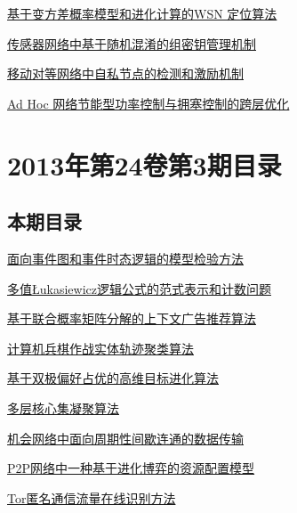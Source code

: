 \documentclass[a4paper]{article}
\begin{document}
\href{http://www.jos.org.cn/ch/reader/download_pdf.aspx?file_no=4255&year_id=2013&quarter_id=4&falg=1}{基于变方差概率模型和进化计算的WSN 定位算法}

\href{http://www.jos.org.cn/ch/reader/download_pdf.aspx?file_no=4270&year_id=2013&quarter_id=4&falg=1}{传感器网络中基于随机混淆的组密钥管理机制}

\href{http://www.jos.org.cn/ch/reader/download_pdf.aspx?file_no=4290&year_id=2013&quarter_id=4&falg=1}{移动对等网络中自私节点的检测和激励机制}

\href{http://www.jos.org.cn/ch/reader/download_pdf.aspx?file_no=4317&year_id=2013&quarter_id=4&falg=1}{Ad Hoc 网络节能型功率控制与拥塞控制的跨层优化}


\section{\textbf{2013年第24卷第3期目录}}
\subsection{本期目录}
\href{http://www.jos.org.cn/ch/reader/download_pdf.aspx?file_no=4162&year_id=2013&quarter_id=3&falg=1}{面向事件图和事件时态逻辑的模型检验方法}

\href{http://www.jos.org.cn/ch/reader/download_pdf.aspx?file_no=4231&year_id=2013&quarter_id=3&falg=1}{多值Łukasiewicz逻辑公式的范式表示和计数问题}

\href{http://www.jos.org.cn/ch/reader/download_pdf.aspx?file_no=4238&year_id=2013&quarter_id=3&falg=1}{基于联合概率矩阵分解的上下文广告推荐算法}

\href{http://www.jos.org.cn/ch/reader/download_pdf.aspx?file_no=4248&year_id=2013&quarter_id=3&falg=1}{计算机兵棋作战实体轨迹聚类算法}

\href{http://www.jos.org.cn/ch/reader/download_pdf.aspx?file_no=4273&year_id=2013&quarter_id=3&falg=1}{基于双极偏好占优的高维目标进化算法}

\href{http://www.jos.org.cn/ch/reader/download_pdf.aspx?file_no=4322&year_id=2013&quarter_id=3&falg=1}{多层核心集凝聚算法}

\href{http://www.jos.org.cn/ch/reader/download_pdf.aspx?file_no=4227&year_id=2013&quarter_id=3&falg=1}{机会网络中面向周期性间歇连通的数据传输}

\href{http://www.jos.org.cn/ch/reader/download_pdf.aspx?file_no=4229&year_id=2013&quarter_id=3&falg=1}{P2P网络中一种基于进化博弈的资源配置模型}

\href{http://www.jos.org.cn/ch/reader/download_pdf.aspx?file_no=4253&year_id=2013&quarter_id=3&falg=1}{Tor匿名通信流量在线识别方法}
\end{document}
